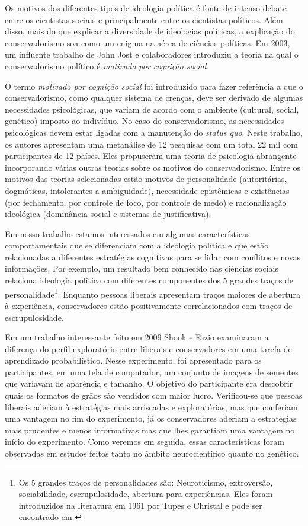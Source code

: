 Os motivos dos diferentes tipos de ideologia política é fonte de intenso debate
entre os cientistas sociais e principalmente entre os cientistas políticos.
Além disso, mais do que explicar a diversidade de ideologias políticas, a
explicação do conservadorismo soa como um enigma na aérea de ciências
políticas. Em 2003, um influente trabalho de John Jost e colaboradores
\citep{Jost2003} introduziu a teoria na qual o conservadorismo político é
\textit{motivado por cognição social}. 

O termo \textit{motivado por cognição social} foi introduzido para fazer
referência a que o conservadorismo, como qualquer sistema de crenças,
deve ser derivado de algumas necessidades psicológicas, que variam de acordo
com o ambiente (cultural, social, genético) imposto ao indivíduo.  No caso
do conservadorismo, as necessidades psicológicas devem estar ligadas com a
manutenção do \textit{status quo}.  Neste trabalho, os autores apresentam
uma metanálise de 12 pesquisas com um total 22 mil com participantes de
12 países. Eles propuseram uma teoria de psicologia abrangente incorporando
várias outras teorias sobre os motivos do conservadorismo. Entre os motivos
das teorias selecionadas estão motivos de personalidade (autoritárias,
dogmáticas, intolerantes a ambiguidade), necessidade epistêmicas e
existências (por fechamento, por controle de foco, por controle de medo) e
racionalização ideológica (dominância social e sistemas de justificativa).

Em nosso trabalho estamos interessados em algumas características
comportamentais que se diferenciam com a ideologia política e que estão
relacionadas a diferentes estratégias cognitivas para se lidar com conflitos
e novas informações. Por exemplo, um resultado bem conhecido nas ciências
sociais relaciona ideologia política com diferentes componentes dos 5 grandes
traços de personalidade\footnote{Os 5 grandes traços de personalidades
são: Neuroticismo, extroversão, sociabilidade, escrupulosidade, abertura
para experiências. Eles foram introduzidos na literatura em 1961 por
Tupes e Christal e pode ser encontrado em \citep{Tupes1961}}.  Enquanto
pessoas liberais apresentam traços maiores de abertura à experiência,
conservadores estão positivamente correlacionados com traços de
escrupulosidade\cite{Gerber2010}.

Em um trabalho interessante feito em 2009 \cite{Shook2009} Shook e
Fazio examinaram a diferença do perfil exploratório entre liberais e
conservadores em uma tarefa de aprendizado probabilístico. Nesse experimento,
foi apresentado para os participantes, em uma tela de computador, um conjunto
de imagens de sementes que variavam de aparência e tamanho. O objetivo do
participante era descobrir quais os formatos de grãos são vendidos com maior
lucro. Verificou-se que pessoas liberais aderiam à estratégias
mais arriscadas e exploratórias, mas que conferiam uma vantagem no fim do
experimento, já os conservadores aderiam a estratégias mais prudentes e menos
informativas mas que lhes garantiam uma vantagem no início do experimento.
Como veremos em seguida, essas características foram observadas em  estudos
feitos tanto no âmbito neurocientífico quanto no genético.

